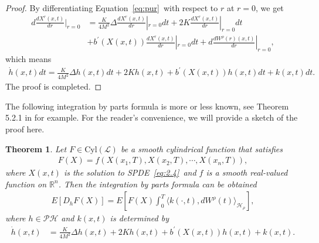 \documentclass[11pt]{article}
\numberwithin{equation}{section}%
\numberwithin{figure}{section}%
\newtheorem{theorem}{Theorem}[section]
\theoremstyle{remark}
\begin{document}
	\begin{proof}
		By differentiating Equation~\eqref{eq:pur}~with respect to $r$ at $r = 0$, we get
		\begin{align*}
			d\frac{dX^{r}(x,t)}{dr}|_{r=0}&=\frac{K}{4M^{2}}\Delta \frac{dX^{r}(x,t)}{dr}|_{r=0}dt+2K \frac{dX^{r}(x,t)}{dr}|_{r=0}dt\\
			&+b^{\prime}(X(x,t))\frac{dX^{r}(x,t)}{dr}|_{r=0}dt	
			+d\frac{dW^{\rho}(r)(x,t)}{dr}|_{r=0},
		\end{align*}
		which means
		\begin{align*}
			\dot{h}(x,t)dt=\frac{K}{4M^{2}}\Delta h(x,t)dt+2K h(x,t) +b^{\prime}(X(x,t))h(x,t)dt+
			k(x,t)dt.
		\end{align*}
		The proof is completed. 
	\end{proof}
The following integration by parts formula is more or less known, see Theorem 5.2.1 in \cite{Zhu2022document} for example. For the reader's convenience, we will provide a sketch of the proof here. 
	\begin{theorem}\label{thm:4.3}
		Let $F\in\text{Cyl}(\mathcal{L})$ be a smooth cylindrical function that satisfies
		\begin{align*}
			F(X)=f(X(x_{1},T), X(x_{2},T), \cdots ,X(x_{n},T)),
		\end{align*}
		where $X(x,t)$ is the solution to SPDE~\eqref{eq:2.4}~and $f$ is a smooth real-valued function on $\mathbb{R}^{n}$. Then the integration by parts formula can be obtained
		\begin{align*}
			E[D_{h}F(X)]=E[F(X)\int_{0}^{T}\langle k(\cdot,t),dW^{\rho}(t)\rangle_{\mathcal{H}_{\rho}}],
		\end{align*}
		where $h\in\mathcal{PH}$ and $k(x,t)$ is determined by
		\begin{align*}
			\dot{h}(x,t)&=\frac{K}{4M^{2}}\Delta h(x,t)+2K h(x,t)+b^{\prime}(X(x,t))h(x,t)+k(x,t).
		\end{align*}
	\end{theorem}
\end{document}

